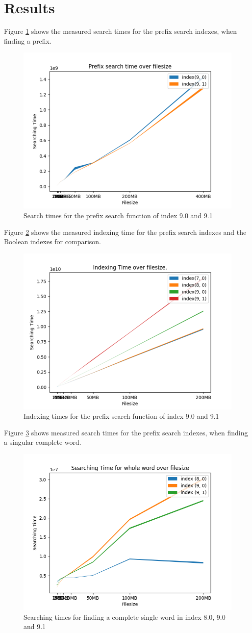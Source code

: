 \section{Results}
Figure \ref{fig:SearchtimePrefix} shows the measured search times for the prefix search indexes, when finding a prefix.

\begin{figure}[ht!]
    \centering
    \includegraphics[width=.5\textwidth]{LaTeX/Pictures/Results/Prefixsearch.png}
    \caption{Search times for the prefix search function of index 9.0 and 9.1}
    \label{fig:SearchtimePrefix}
\end{figure}

Figure \ref{fig:IndexingBoolPrefi} shows the measured indexing time for the prefix search indexes and the Boolean indexes for comparison.

\begin{figure}[ht!]
    \centering
    \includegraphics[width=.5\textwidth]{LaTeX/Pictures/Results/Indexing[(7, 0), (8, 0), (9, 0), (9, 1)].png}
    \caption{Indexing times for the prefix search function of index 9.0 and 9.1}
    \label{fig:IndexingBoolPrefi}
\end{figure}

Figure \ref{fig:findword} shows measured search times for the prefix search indexes, when finding a singular complete word.

\begin{figure}[ht!]
    \centering
    \includegraphics[width=.5\textwidth]{LaTeX/Pictures/Results/Findword.png}
    \caption{Searching times for finding a complete single word in index 8.0, 9.0 and 9.1}
    \label{fig:findword}
\end{figure}